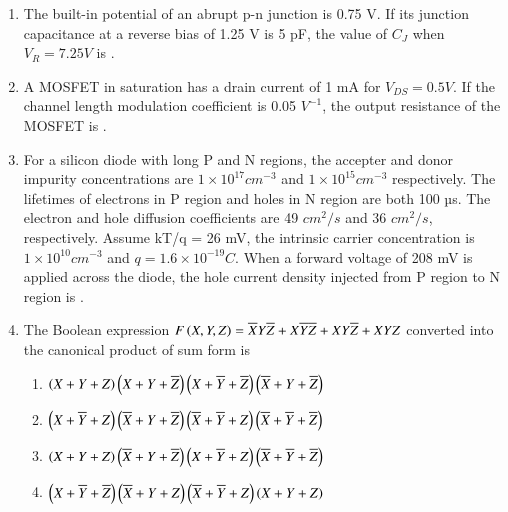 \documentclass[a4paper, 11pt]{article}
\begin{document}
\begin{enumerate}
    \hfill{}

    \item The built-in potential of an abrupt p-n junction is 0.75 V. If its junction capacitance  at a reverse bias  of 1.25 V is 5 pF, the value of $C_{J}$  when $V_{R}=7.25 V$ is \underline{\hspace{2cm}}.
    
    \hfill{}

    \item A MOSFET in saturation has a drain current of 1 mA for $V_{DS}=0.5 V$. If the channel length modulation coefficient is 0.05 $V^{-1}$, the output resistance  of the MOSFET is \underline{\hspace{2cm}}.
    
    \hfill{}

    \item For a silicon diode with long P and N regions, the accepter and donor impurity concentrations are $1\times10^{17}cm^{-3}$ and $1\times10^{15}cm^{-3}$ respectively. The lifetimes of electrons in P region and holes in N region are both 100 µs. The electron and hole diffusion coefficients are 49 $cm^{2}/s$ and 36 $cm^{2}/s$, respectively. Assume kT/q = 26 mV, the intrinsic carrier concentration is $1\times10^{10}cm^{-3}$ and $q=1.6\times10^{-19}C$. When a forward voltage of 208 mV is applied across the diode, the hole current density  injected from P region to N region is \underline{\hspace{2cm}}.
    
    \hfill{}

    \item The Boolean expression $F\left(X,Y,Z\right)=\overline{X}Y\overline{Z}+X\overline{Y}\overline{Z}+X Y\overline{Z}+XYZ$ converted into the canonical product of sum  form is
    \begin{enumerate}
        \item $\left(X+Y+Z\right)\left(X+Y+\overline{Z}\right)\left(X+\overline{Y}+\overline{Z}\right)\left(\overline{X}+Y+\overline{Z}\right)$
        \item $\left(X+\overline{Y}+Z\right)\left(\overline{X}+Y+\overline{Z}\right)\left(\overline{X}+\overline{Y}+Z\right)\left(\overline{X}+\overline{Y}+\overline{Z}\right)$
        \item $\left(X+Y+Z\right)\left(\overline{X}+Y+\overline{Z}\right)\left(X+\overline{Y}+Z\right)\left(\overline{X}+\overline{Y}+\overline{Z}\right)$
        \item $\left(X+\overline{Y}+\overline{Z}\right)\left(\overline{X}+Y+Z\right)\left(\overline{X}+\overline{Y}+Z\right)\left(X+Y+Z\right)$
    \end{enumerate}
    

\end{enumerate}
\end{document}
